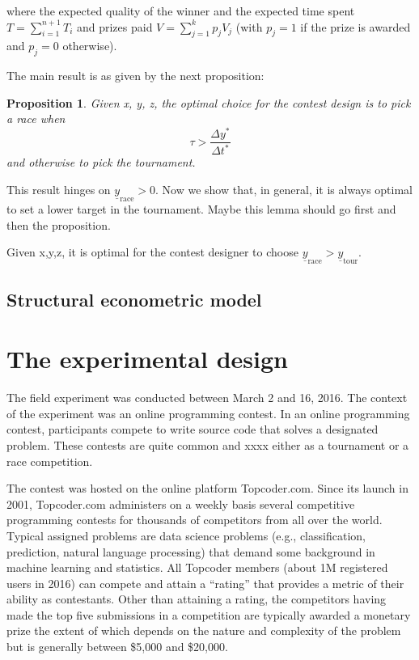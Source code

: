 \documentclass[12pt,]{article}
\newtheorem{proposition}{Proposition}
\newcommand\target{\underline{y}}
\newcommand\race{\text{race}}
\newcommand\tournament{\text{tour}}
\begin{document}
where the expected quality of the winner and the expected time spent
\(T=\sum_{i=1}^{n+1} T_i\) and prizes paid \(V=\sum_{j=1}^k p_{j} V_j\)
(with \(p_j=1\) if the prize is awarded and \(p_j=0\) otherwise).

The main result is as given by the next proposition:

\begin{proposition}
Given x, y, z, the optimal choice for the contest design is to pick a race when 
\begin{equation}
  \tau > \frac{\Delta y^*} {\Delta t^*} 
\end{equation}
and otherwise to pick the tournament.
\end{proposition}

This result hinges on \(\target_\race > 0\). Now we show that, in
general, it is always optimal to set a lower target in the tournament.
Maybe this lemma should go first and then the proposition.

\begin{lemma}
Given x,y,z, it is optimal for the contest designer to choose $\target_\race > \target_\tournament$. 
\end{lemma}

\subsection{Structural econometric
model}\label{structural-econometric-model}

\section{The experimental design}\label{the-experimental-design}

The field experiment was conducted between March 2 and 16, 2016. The
context of the experiment was an online programming contest. In an
online programming contest, participants compete to write source code
that solves a designated problem. These contests are quite common and
xxxx either as a tournament or a race competition.

The contest was hosted on the online platform Topcoder.com. Since its
launch in 2001, Topcoder.com administers on a weekly basis several
competitive programming contests for thousands of competitors from all
over the world. Typical assigned problems are data science problems
(e.g., classification, prediction, natural language processing) that
demand some background in machine learning and statistics. All Topcoder
members (about 1M registered users in 2016) can compete and attain a
``rating'' that provides a metric of their ability as contestants. Other
than attaining a rating, the competitors having made the top five
submissions in a competition are typically awarded a monetary prize the
extent of which depends on the nature and complexity of the problem but
is generally between \$5,000 and \$20,000.
\end{document}
